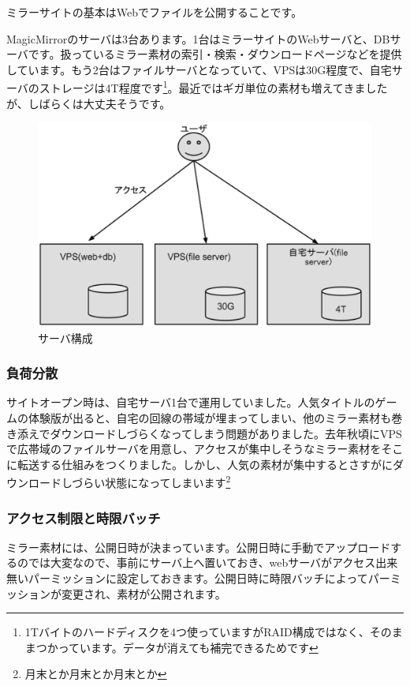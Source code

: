 ミラーサイトの基本はWebでファイルを公開することです。

MagicMirrorのサーバは3台あります。1台はミラーサイトのWebサーバと、DBサーバです。扱っているミラー素材の索引・検索・ダウンロードページなどを提供しています。もう2台はファイルサーバとなっていて、VPSは30G程度で、自宅サーバのストレージは4T程度です\footnote{1Tバイトのハードディスクを4つ使っていますがRAID構成ではなく、そのままつかっています。データが消えても補完できるためです}。最近ではギガ単位の素材も増えてきましたが、しばらくは大丈夫そうです。

\begin{figure}[htbp]
 \begin{center}
  \includegraphics[width=120mm]{ijust3-mirror/img/mirror-servers.eps}
 \end{center}
 \caption{サーバ構成}
 \label{fig:mirror-servers}
\end{figure}

\subsubsection{負荷分散}
サイトオープン時は、自宅サーバ1台で運用していました。人気タイトルのゲームの体験版が出ると、自宅の回線の帯域が埋まってしまい、他のミラー素材も巻き添えでダウンロードしづらくなってしまう問題がありました。去年秋頃にVPSで広帯域のファイルサーバを用意し、アクセスが集中しそうなミラー素材をそこに転送する仕組みをつくりました。しかし、人気の素材が集中するとさすがにダウンロードしづらい状態になってしまいます\footnote{月末とか月末とか月末とか}

\subsubsection{アクセス制限と時限バッチ}
ミラー素材には、公開日時が決まっています。公開日時に手動でアップロードするのでは大変なので、事前にサーバ上へ置いておき、webサーバがアクセス出来無いパーミッションに設定しておきます。公開日時に時限バッチによってパーミッションが変更され、素材が公開されます。

